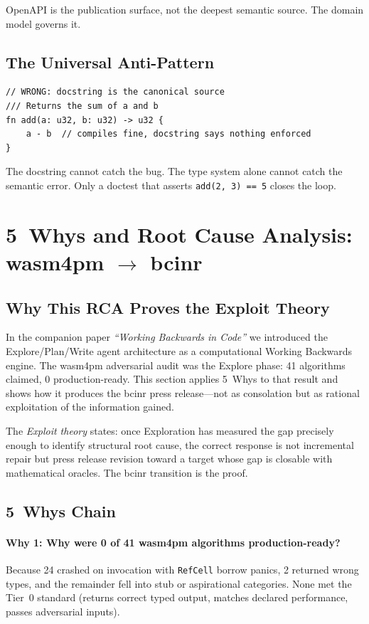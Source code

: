 \documentclass[11pt,a4paper]{article}
\theoremstyle{definition}
\begin{document}
\noindent OpenAPI is the publication surface, not the deepest semantic source. The domain model governs it.

\subsection{The Universal Anti-Pattern}
\begin{lstlisting}
// WRONG: docstring is the canonical source
/// Returns the sum of a and b
fn add(a: u32, b: u32) -> u32 {
    a - b  // compiles fine, docstring says nothing enforced
}
\end{lstlisting}

\noindent The docstring cannot catch the bug. The type system alone cannot catch the semantic error. Only a doctest that asserts \texttt{add(2, 3) == 5} closes the loop.

\section{5~Whys and Root Cause Analysis: wasm4pm $\to$ bcinr}

\subsection{Why This RCA Proves the Exploit Theory}

In the companion paper \textit{``Working Backwards in Code''} we introduced the Explore/Plan/Write agent architecture as a computational Working Backwards engine. The wasm4pm adversarial audit was the Explore phase: 41 algorithms claimed, 0 production-ready. This section applies 5~Whys to that result and shows how it produces the bcinr press release---not as consolation but as rational exploitation of the information gained.

The \emph{Exploit theory} states: once Exploration has measured the gap precisely enough to identify structural root cause, the correct response is not incremental repair but press release revision toward a target whose gap is closable with mathematical oracles. The bcinr transition is the proof.

\subsection{5~Whys Chain}

\paragraph{Why 1: Why were 0 of 41 wasm4pm algorithms production-ready?}
Because 24 crashed on invocation with \texttt{RefCell} borrow panics, 2 returned wrong types, and the remainder fell into stub or aspirational categories. None met the Tier~0 standard (returns correct typed output, matches declared performance, passes adversarial inputs).
\end{document}
